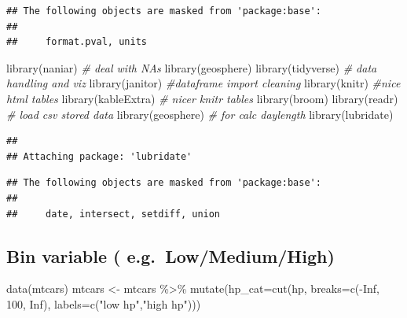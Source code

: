 \documentclass[
]{article}
\newenvironment{Shaded}{\begin{snugshade}}{\end{snugshade}}
\newcommand{\AttributeTok}[1]{\textcolor[rgb]{0.77,0.63,0.00}{#1}}
\newcommand{\CommentTok}[1]{\textcolor[rgb]{0.56,0.35,0.01}{\textit{#1}}}
\newcommand{\ConstantTok}[1]{\textcolor[rgb]{0.00,0.00,0.00}{#1}}
\newcommand{\DecValTok}[1]{\textcolor[rgb]{0.00,0.00,0.81}{#1}}
\newcommand{\FunctionTok}[1]{\textcolor[rgb]{0.00,0.00,0.00}{#1}}
\newcommand{\NormalTok}[1]{#1}
\newcommand{\OtherTok}[1]{\textcolor[rgb]{0.56,0.35,0.01}{#1}}
\newcommand{\SpecialCharTok}[1]{\textcolor[rgb]{0.00,0.00,0.00}{#1}}
\newcommand{\StringTok}[1]{\textcolor[rgb]{0.31,0.60,0.02}{#1}}
\begin{document}
\begin{verbatim}
## The following objects are masked from 'package:base':
## 
##     format.pval, units
\end{verbatim}

\begin{Shaded}
\begin{Highlighting}[]
\FunctionTok{library}\NormalTok{(naniar) }\CommentTok{\# deal with NAs}
\FunctionTok{library}\NormalTok{(geosphere)}
\FunctionTok{library}\NormalTok{(tidyverse) }\CommentTok{\# data handling and viz}
\FunctionTok{library}\NormalTok{(janitor) }\CommentTok{\#dataframe import cleaning}
\FunctionTok{library}\NormalTok{(knitr) }\CommentTok{\#nice html tables}
\FunctionTok{library}\NormalTok{(kableExtra) }\CommentTok{\# nicer knitr tables}
\FunctionTok{library}\NormalTok{(broom)}
\FunctionTok{library}\NormalTok{(readr) }\CommentTok{\# load csv stored data}
\FunctionTok{library}\NormalTok{(geosphere) }\CommentTok{\# for calc daylength}
\FunctionTok{library}\NormalTok{(lubridate)}
\end{Highlighting}
\end{Shaded}

\begin{verbatim}
## 
## Attaching package: 'lubridate'
\end{verbatim}

\begin{verbatim}
## The following objects are masked from 'package:base':
## 
##     date, intersect, setdiff, union
\end{verbatim}

\hypertarget{bin-variable-e.g.-lowmediumhigh}{%
\subsection{Bin variable ( e.g.~Low/Medium/High)}\label{bin-variable-e.g.-lowmediumhigh}}

\begin{Shaded}
\begin{Highlighting}[]
\FunctionTok{data}\NormalTok{(mtcars)}
\NormalTok{mtcars }\OtherTok{\textless{}{-}}\NormalTok{ mtcars }\SpecialCharTok{\%\textgreater{}\%} \FunctionTok{mutate}\NormalTok{(}\AttributeTok{hp\_cat=}\FunctionTok{cut}\NormalTok{(hp, }\AttributeTok{breaks=}\FunctionTok{c}\NormalTok{(}\SpecialCharTok{{-}}\ConstantTok{Inf}\NormalTok{, }\DecValTok{100}\NormalTok{, }\ConstantTok{Inf}\NormalTok{), }
                                       \AttributeTok{labels=}\FunctionTok{c}\NormalTok{(}\StringTok{"low hp"}\NormalTok{,}\StringTok{"high hp"}\NormalTok{)))}
\end{Highlighting}
\end{Shaded}
\end{document}
